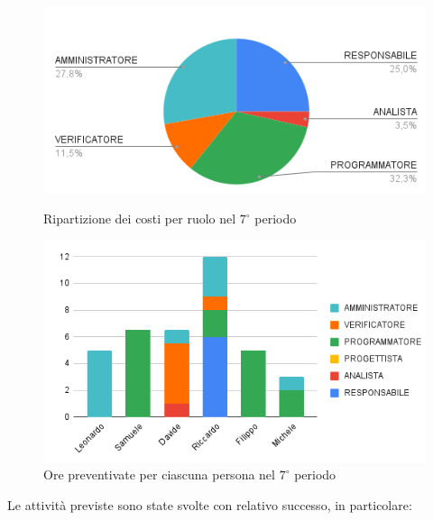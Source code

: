 \begin{figure}[H]
  \centering
  \includegraphics[width=0.6\linewidth]{grafici/7_periodo_torta.png}
  \caption{Ripartizione dei costi per ruolo nel $7^\circ$ periodo}
        \vspace{10mm}
  \includegraphics[width=0.7\linewidth]{grafici/7_periodo_istogramma.png}
  \caption{Ore preventivate per ciascuna persona nel $7^\circ$ periodo}
\end{figure}
Le attività previste sono state svolte con relativo successo, in particolare:
